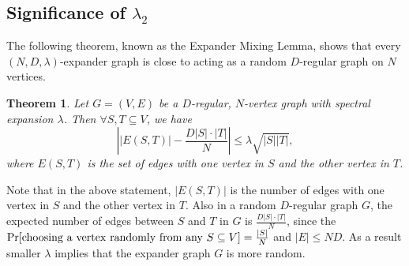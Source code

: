 \documentclass{article}
\newtheorem{theorem}{Theorem}[section]
\begin{document}
\subsection{Significance of $\lambda_2$}
The following theorem, known as the Expander Mixing Lemma, shows that every $(N,D,\lambda )$-expander graph is close to acting as a random $D$-regular graph on $N$ vertices.
\begin{theorem}{\rm \cite{AC1988}}
Let $G=(V,E)$ be a $D$-regular, $N$-vertex graph with spectral expansion $\lambda$. Then $\forall S,T\subseteq V$, we have
\[
\left ||E(S,T)|-\frac{D|S|\cdot |T|}{N}\right |\leq \lambda \sqrt{|S||T|},
\]
where $E(S,T)$ is the set of edges with one vertex in $S$ and the other vertex in $T$.
\end{theorem}
Note that in the above statement, $|E(S,T)|$ is the number of edges with one vertex in $S$ and the other vertex in $T$. Also in a random $D$-regular graph $G$, the expected number of edges between $S$ and $T$ in $G$ is $\frac{D|S|\cdot |T|}{N}$, since the $\Pr [{\rm choosing~a~vertex~randomly~from~any}~S\subseteq V]=\frac{|S|}{N}$ and $|E|\leq ND$. As a result smaller $\lambda$ implies that the expander graph $G$ is more random.
\end{document}
